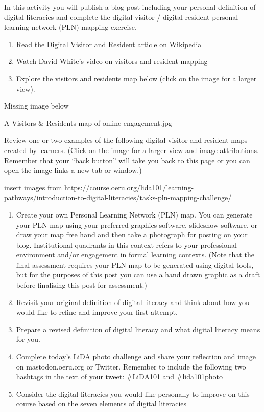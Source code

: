 \documentclass[
]{book}
\providecommand{\tightlist}{%
  \setlength{\itemsep}{0pt}\setlength{\parskip}{0pt}}
\theoremstyle{definition}
\theoremstyle{definition}
\theoremstyle{definition}
\theoremstyle{definition}
\theoremstyle{remark}
\begin{document}
\begin{reflect}
In this activity you will publish a blog post including your personal definition of digital literacies and complete the digital visitor / digital resident personal learning network (PLN) mapping exercise.

\begin{enumerate}
\def\labelenumi{\arabic{enumi}.}
\tightlist
\item
  Read the Digital Visitor and Resident article on Wikipedia\\
\item
  Watch David White's video on visitors and resident mapping\\
\item
  Explore the visitors and residents map below (click on the image for a larger view).
\end{enumerate}

{Missing image below}

A Visitors \& Residents map of online engagement.jpg

Review one or two examples of the following digital visitor and resident maps created by learners. (Click on the image for a larger view and image attributions. Remember that your ``back button'' will take you back to this page or you can open the image links a new tab or window.)

insert images from \url{https://course.oeru.org/lida101/learning-pathways/introduction-to-digital-literacies/tasks-pln-mapping-challenge/}

\begin{enumerate}
\def\labelenumi{\arabic{enumi}.}
\tightlist
\item
  Create your own Personal Learning Network (PLN) map. You can generate your PLN map using your preferred graphics software, slideshow software, or draw your map free hand and then take a photograph for posting on your blog. Institutional quadrants in this context refers to your professional environment and/or engagement in formal learning contexts. (Note that the final assessment requires your PLN map to be generated using digital tools, but for the purposes of this post you can use a hand drawn graphic as a draft before finalising this post for assessment.)\\
\item
  Revisit your original definition of digital literacy and think about how you would like to refine and improve your first attempt.\\
\item
  Prepare a revised definition of digital literacy and what digital literacy means for you.\\
\item
  Complete today's LiDA photo challenge and share your reflection and image on mastodon.oeru.org or Twitter. Remember to include the following two hashtags in the text of your tweet: \#LiDA101 and \#lida101photo\\
\item
  Consider the digital literacies you would like personally to improve on this course based on the seven elements of digital literacies
\end{enumerate}
\end{reflect}
\end{document}
